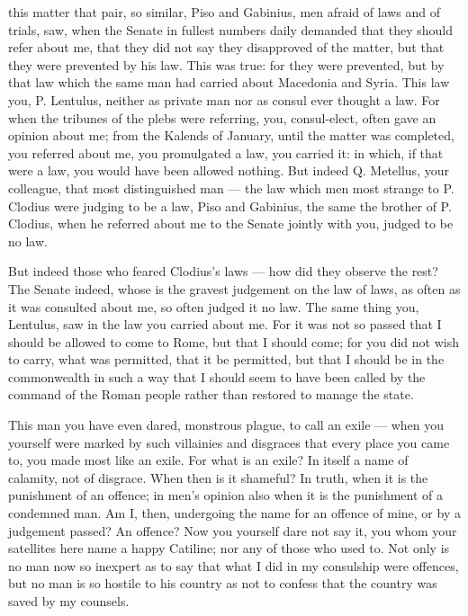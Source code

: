  this matter that pair, so similar, Piso and Gabinius, men afraid of laws and of trials, saw, when the Senate in fullest numbers daily demanded that they should refer about me, that they did not say they disapproved of the matter, but that they were prevented by his law. This was true: for they were prevented, but by that law which the same man had carried about Macedonia and Syria. This law you, P. Lentulus, neither as private man nor as consul ever thought a law. For when the tribunes of the plebs were referring, you, consul-elect, often gave an opinion about me; from the Kalends of January, until the matter was completed, you referred about me, you promulgated a law, you carried it: in which, if that were a law, you would have been allowed nothing. But indeed Q. Metellus, your colleague, that most distinguished man --- the law which men most strange to P. Clodius were judging to be a law, Piso and Gabinius, the same the brother of P. Clodius, when he referred about me to the Senate jointly with you, judged to be no law.

 But indeed those who feared Clodius's laws --- how did they observe the rest? The Senate indeed, whose is the gravest judgement on the law of laws, as often as it was consulted about me, so often judged it no law. The same thing you, Lentulus, saw in the law you carried about me. For it was not so passed that I should be allowed to come to Rome, but that I should come; for you did not wish to carry, what was permitted, that it be permitted, but that I should be in the commonwealth in such a way that I should seem to have been called by the command of the Roman people rather than restored to manage the state.

 This man you have even dared, monstrous plague, to call an exile --- when you yourself were marked by such villainies and disgraces that every place you came to, you made most like an exile. For what is an exile? In itself a name of calamity, not of disgrace. When then is it shameful? In truth, when it is the punishment of an offence; in men's opinion also when it is the punishment of a condemned man. Am I, then, undergoing the name for an offence of mine, or by a judgement passed? An offence? Now you yourself dare not say it, you whom your satellites here name a happy Catiline; nor any of those who used to. Not only is no man now so inexpert as to say that what I did in my consulship were offences, but no man is so hostile to his country as not to confess that the country was saved by my counsels.


